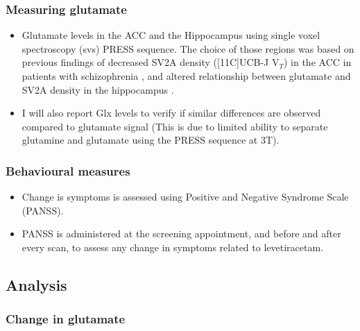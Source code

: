 \documentclass[
  letterpaper,
  DIV=11,
  numbers=noendperiod]{scrartcl}
\providecommand{\tightlist}{%
  \setlength{\itemsep}{0pt}\setlength{\parskip}{0pt}}\usepackage{longtable,booktabs,array}
\begin{document}
\subsubsection{Measuring glutamate}\label{measuring-glutamate}

\begin{itemize}
\tightlist
\item
  Glutamate levels in the ACC and the Hippocampus using single voxel
  spectroscopy (svs) PRESS sequence. The choice of those regions was
  based on previous findings of decreased SV2A density ({[}11C{]}UCB-J
  V\(_T\)) in the ACC in patients with schizophrenia
  \autocite{onwordi_synaptic_2020}, and altered relationship between
  glutamate and SV2A density in the hippocampus
  \autocite{onwordi_relationship_2021}.
\item
  I will also report Glx levels to verify if similar differences are
  observed compared to glutamate signal (This is due to limited ability
  to separate glutamine and glutamate using the PRESS sequence at 3T).
\end{itemize}

\subsubsection{Behavioural measures}\label{behavioural-measures}

\begin{itemize}
\tightlist
\item
  Change is symptoms is assessed using Positive and Negative Syndrome
  Scale (PANSS).
\item
  PANSS is administered at the screening appointment, and before and
  after every scan, to assess any change in symptoms related to
  levetiracetam.
\end{itemize}

\subsection{Analysis}\label{analysis}

\subsubsection{Change in glutamate}\label{change-in-glutamate}
\end{document}
